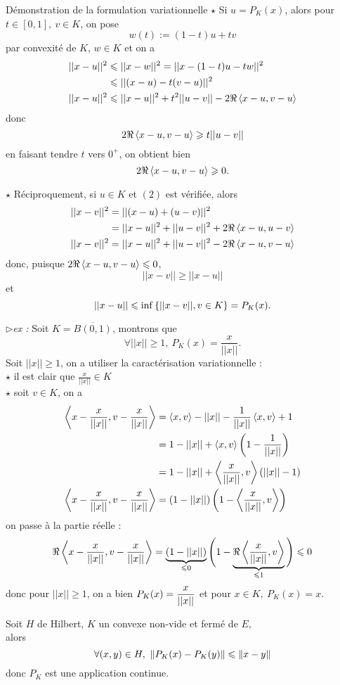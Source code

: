 \documentclass[a4paper,11pt, twoside]{article}
\begin{document}
\begin{ProofC}{Démonstration de la formulation variationnelle}
  $\star$ Si $u=P_K(x)$, alors pour $t\in [0,1],\ v\in K$, on pose 
  $$w(t):=(1-t)u+tv$$
  par convexité de $K$, $w\in K$ et on a 
  \begin{align*}
    ||x-u||^2&\leqslant ||x-w||^2=||x-(1-t)u-tw||^2\\
    &\leqslant ||(x-u)-t(v-u)||^2\\
    ||x-u||^2&\leqslant ||x-u||^2+t^2||u-v||-2\Re\left\langle x-u,v-u \right\rangle
  \end{align*}
  donc 
  $$2\Re \left\langle x-u,v-u \right\rangle\geqslant t||u-v||$$
  en faisant tendre $t$ vers $0^+$, on obtient bien 
  $$2\Re \left\langle x-u,v-u \right\rangle\geqslant 0.$$

  $\star$ Réciproquement, si $u\in K$ et $(\mathit 2)$ est vérifiée, alors 
  \begin{align*}
    ||x-v||^2&=||(x-u)+(u-v)||^2\\
    &=||x-u||^2+||u-v||^2+2\Re\left\langle x-u,u-v \right\rangle\\
    ||x-v||^2&=||x-u||^2+||u-v||^2-2\Re\left\langle x-u,v-u \right\rangle\\
  \end{align*}
  donc, puisque $2\Re\left\langle x-u,v-u \right\rangle\leqslant 0$, 
  $$||x-v||\geqslant ||x-u||$$
  et 
  $$||x-u||\leqslant\mathrm{inf}\left\{||x-v||, v\in K\right\}=P_K(x).$$
\end{ProofC}


$\triangleright$\emph{ex : }Soit $K=\overline{B(0,1)}$, montrons que 
$$\forall ||x||\geqslant 1,\ P_K(x)=\frac{x}{||x||}.$$
Soit $||x||\geqslant 1$, on a utiliser la caractérisation variationnelle :\\

$\star$ il est clair que $\displaystyle\frac{x}{||x||}\in K$\\

$\star$ soit $v\in K$, on a 
\begin{align*}
  \left\langle x-\displaystyle\frac{x}{||x||},v-\displaystyle\frac{x}{||x||} \right\rangle&=\left\langle x,v \right\rangle-||x||-\frac{1}{||x||}\left\langle x,v \right\rangle+1\\
  &=1-||x||+\left\langle x,v \right\rangle\left(1-\frac{1}{||x||}\right)\\
  &=1-||x||+\left\langle \displaystyle\frac{x}{||x||},v \right\rangle\left(||x||-1\right)\\
  \left\langle x-\displaystyle\frac{x}{||x||},v-\displaystyle\frac{x}{||x||} \right\rangle&=\left(1-||x||\right)\left(1-\left\langle \displaystyle\frac{x}{||x||},v \right\rangle\right)
\end{align*}
on passe à la partie réelle :
$$\Re\left\langle x-\displaystyle\frac{x}{||x||},v-\displaystyle\frac{x}{||x||} \right\rangle=\underbrace{\left(1-||x||\right)}_{\leqslant 0}\Bigg(1-\underbrace{\Re\left\langle \displaystyle\frac{x}{||x||},v \right\rangle}_{\leqslant 1}\Bigg)\leqslant 0$$
donc pour $||x||\geqslant 1$, on a bien $P_K(x)=\displaystyle\frac{x}{||x||}$ et pour $x\in K,\ P_K(x)=x.$
\begin{prop}
  Soit $H$ de Hilbert, $K$ un convexe non-vide et fermé de $E$,\\

  alors 
  $$\forall (x,y)\in H,\ \norm{P_K(x)-P_K(y)}\leqslant\norm{x-y}$$
  donc $P_K$ est une application continue.
\end{prop}
\end{document}

